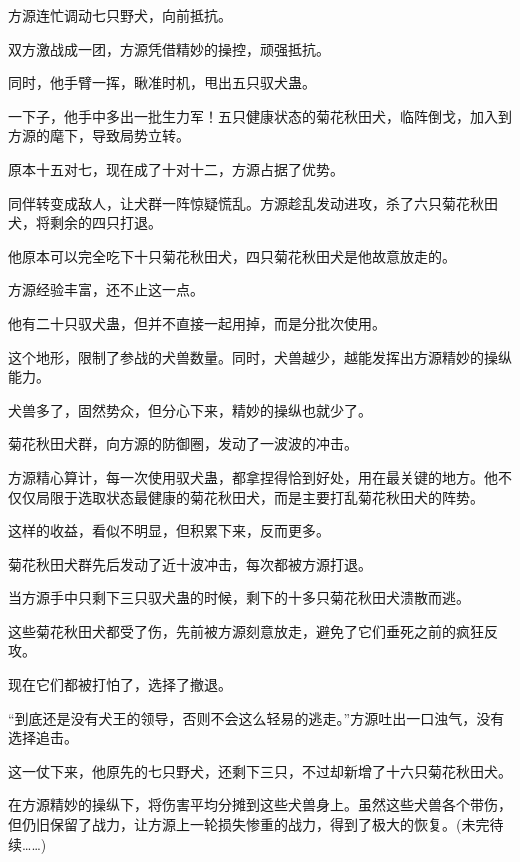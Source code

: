 \begin{this_body}
方源连忙调动七只野犬，向前抵抗。

双方激战成一团，方源凭借精妙的操控，顽强抵抗。

同时，他手臂一挥，瞅准时机，甩出五只驭犬蛊。

一下子，他手中多出一批生力军！五只健康状态的菊花秋田犬，临阵倒戈，加入到方源的麾下，导致局势立转。

原本十五对七，现在成了十对十二，方源占据了优势。

同伴转变成敌人，让犬群一阵惊疑慌乱。方源趁乱发动进攻，杀了六只菊花秋田犬，将剩余的四只打退。

他原本可以完全吃下十只菊花秋田犬，四只菊花秋田犬是他故意放走的。

方源经验丰富，还不止这一点。

他有二十只驭犬蛊，但并不直接一起用掉，而是分批次使用。

这个地形，限制了参战的犬兽数量。同时，犬兽越少，越能发挥出方源精妙的操纵能力。

犬兽多了，固然势众，但分心下来，精妙的操纵也就少了。

菊花秋田犬群，向方源的防御圈，发动了一波波的冲击。

方源精心算计，每一次使用驭犬蛊，都拿捏得恰到好处，用在最关键的地方。他不仅仅局限于选取状态最健康的菊花秋田犬，而是主要打乱菊花秋田犬的阵势。

这样的收益，看似不明显，但积累下来，反而更多。

菊花秋田犬群先后发动了近十波冲击，每次都被方源打退。

当方源手中只剩下三只驭犬蛊的时候，剩下的十多只菊花秋田犬溃散而逃。

这些菊花秋田犬都受了伤，先前被方源刻意放走，避免了它们垂死之前的疯狂反攻。

现在它们都被打怕了，选择了撤退。

“到底还是没有犬王的领导，否则不会这么轻易的逃走。”方源吐出一口浊气，没有选择追击。

这一仗下来，他原先的七只野犬，还剩下三只，不过却新增了十六只菊花秋田犬。

在方源精妙的操纵下，将伤害平均分摊到这些犬兽身上。虽然这些犬兽各个带伤，但仍旧保留了战力，让方源上一轮损失惨重的战力，得到了极大的恢复。(未完待续……)

\end{this_body}

